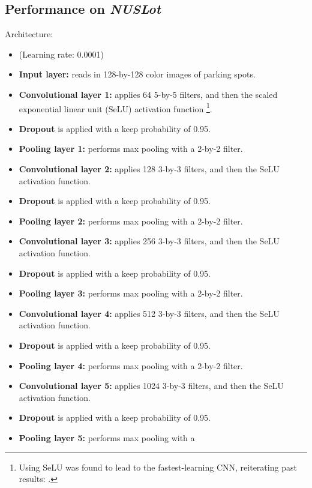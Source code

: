 \documentclass[a4paper, 11pt]{article} %
\begin{document}
	\subsection{Performance on \textit{NUSLot}}
	Architecture:
		\begin{itemize}
			\setlength\itemsep{-3mm}
			\item[] (Learning rate: 0.0001)
			\item[] \textbf{Input layer:} reads in 128-by-128 color images of 
			parking spots.
			\item[] \textbf{Convolutional layer 1:} applies 64 5-by-5 filters, 
			and 
			then the 
			scaled exponential linear unit (SeLU) activation function 
			\footnote{Using SeLU was found to lead to the fastest-learning CNN, 
			reiterating past results: \cite{selu-motivation}\relax.}.
			\item[] \textbf{Dropout} is applied with a keep probability of 0.95.
			\item[] \textbf{Pooling layer 1:} performs max pooling with a 
			2-by-2 
			filter.
			\item[] \textbf{Convolutional layer 2:} applies 128 3-by-3 filters, 
			and 
			then the 
			SeLU activation function.
			\item[] \textbf{Dropout} is applied with a keep probability of 0.95.
			\item[] \textbf{Pooling layer 2:} performs max pooling with a 
			2-by-2 
			filter.
			\item[] \textbf{Convolutional layer 3:} applies 256 3-by-3 filters, 
			and 
			then the 
			SeLU activation function.
			\item[] \textbf{Dropout} is applied with a keep probability of 0.95.
			\item[] \textbf{Pooling layer 3:} performs max pooling with a 
			2-by-2 
			filter.
			\item[] \textbf{Convolutional layer 4:} applies 512 3-by-3 filters, 
			and 
			then the 
			SeLU activation function.
			\item[] \textbf{Dropout} is applied with a keep probability of 0.95.
			\item[] \textbf{Pooling layer 4:} performs max pooling with a 
			2-by-2 
			filter.
			\item[] \textbf{Convolutional layer 5:} applies 1024 3-by-3 
			filters, 
			and then 
			the SeLU activation function.
			\item[] \textbf{Dropout} is applied with a keep probability of 0.95.
			\item[] \textbf{Pooling layer 5:} performs max pooling with a 

\end{itemize}
\end{document}
